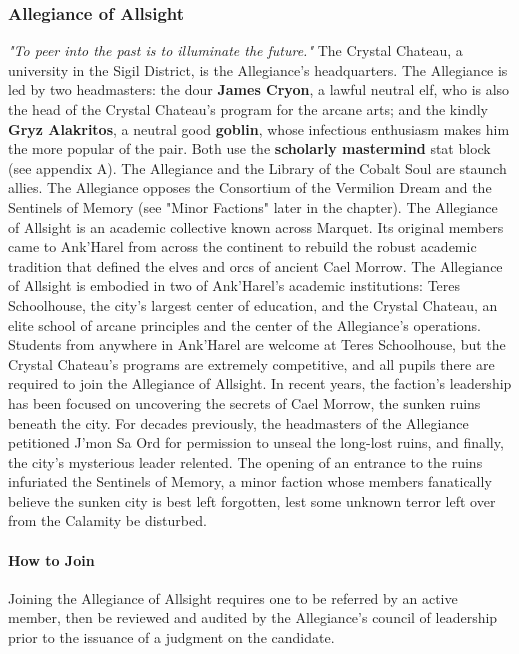 \documentclass[10pt,a4,twoside,twocolumn,openany,nodeprecatedcode]{dndbook}
\begin{document}
\subsubsection{Allegiance of Allsight}
\textit{"To peer into the past is to illuminate the future."}
{{The Crystal Chateau, a university in the Sigil District, is the Allegiance's headquarters.}}
{{The Allegiance is led by two headmasters: the dour \textbf{James Cryon}, a lawful neutral elf, who is also the head of the Crystal Chateau's program for the arcane arts; and the kindly \textbf{Gryz Alakritos}, a neutral good \textbf{goblin}, whose infectious enthusiasm makes him the more popular of the pair. Both use the \textbf{scholarly mastermind} stat block (see appendix A).}}
{{The Allegiance and the Library of the Cobalt Soul are staunch allies.}}
{{The Allegiance opposes the Consortium of the Vermilion Dream and the Sentinels of Memory (see "Minor Factions" later in the chapter).}}
The Allegiance of Allsight is an academic collective known across Marquet. Its original members came to Ank'Harel from across the continent to rebuild the robust academic tradition that defined the elves and orcs of ancient Cael Morrow.
The Allegiance of Allsight is embodied in two of Ank'Harel's academic institutions: Teres Schoolhouse, the city's largest center of education, and the Crystal Chateau, an elite school of arcane principles and the center of the Allegiance's operations. Students from anywhere in Ank'Harel are welcome at Teres Schoolhouse, but the Crystal Chateau's programs are extremely competitive, and all pupils there are required to join the Allegiance of Allsight.
In recent years, the faction's leadership has been focused on uncovering the secrets of Cael Morrow, the sunken ruins beneath the city. For decades previously, the headmasters of the Allegiance petitioned J'mon Sa Ord for permission to unseal the long-lost ruins, and finally, the city's mysterious leader relented. The opening of an entrance to the ruins infuriated the Sentinels of Memory, a minor faction whose members fanatically believe the sunken city is best left forgotten, lest some unknown terror left over from the Calamity be disturbed.
\paragraph{How to Join}
Joining the Allegiance of Allsight requires one to be referred by an active member, then be reviewed and audited by the Allegiance's council of leadership prior to the issuance of a judgment on the candidate.
\end{document}
